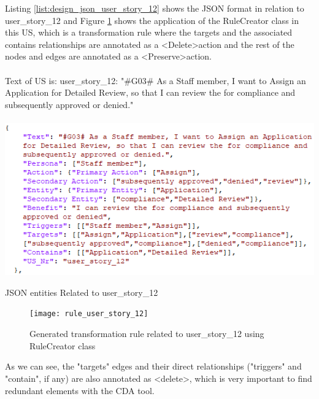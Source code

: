 \begin{example}
	Listing \ref{list:design_json_user_story_12} shows the JSON format in relation to user\_story\_12 and Figure \ref{fig:desing_rule_user_story_12} shows the application of the RuleCreator class in this US, which is a transformation rule where the targets and the associated contains relationships are annotated as a \textless Delete\textgreater action and the rest of the nodes and edges are annotated as a \textless Preserve\textgreater action.\\\\
	Text of US is:
	user\_story\_12: "\#G03\# As a Staff member, I want to Assign an Application for Detailed Review, so that I can review the for compliance and subsequently approved or denied."
	\begin{MyListing}
		\paragraph{}
		\centering
		\includegraphics[scale=0.8]{Listing/json_user_story_12.png}
		\caption{JSON entities Related to user\_story\_12}\label{list:design_json_user_story_12}
	\end{MyListing}
	\begin{figure}[h]
		\centering
		\texttt{[image: rule\_user\_story\_12]}
		\caption{Generated transformation rule related to user\_story\_12 using RuleCreator class}\label{fig:desing_rule_user_story_12}
	\end{figure}
	As we can see, the "targets" edges and their direct relationships ("triggers" and "contain", if any) are also annotated as \textless delete\textgreater, which is very important to find redundant elements with the CDA tool.
\end{example}
